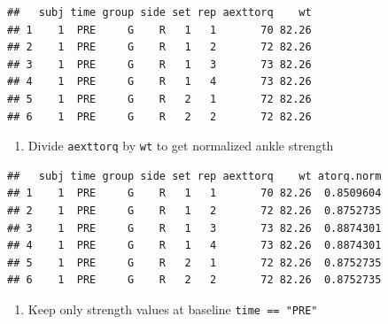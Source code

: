 \documentclass[
]{book}
\newenvironment{Shaded}{\begin{snugshade}}{\end{snugshade}}
\newcommand{\DataTypeTok}[1]{\textcolor[rgb]{0.13,0.29,0.53}{#1}}
\newcommand{\KeywordTok}[1]{\textcolor[rgb]{0.13,0.29,0.53}{\textbf{#1}}}
\newcommand{\NormalTok}[1]{#1}
\newcommand{\OperatorTok}[1]{\textcolor[rgb]{0.81,0.36,0.00}{\textbf{#1}}}
\newcommand{\StringTok}[1]{\textcolor[rgb]{0.31,0.60,0.02}{#1}}
\providecommand{\tightlist}{%
  \setlength{\itemsep}{0pt}\setlength{\parskip}{0pt}}
\begin{document}
\begin{verbatim}
##   subj time group side set rep aexttorq    wt
## 1    1  PRE     G    R   1   1       70 82.26
## 2    1  PRE     G    R   1   2       72 82.26
## 3    1  PRE     G    R   1   3       73 82.26
## 4    1  PRE     G    R   1   4       73 82.26
## 5    1  PRE     G    R   2   1       72 82.26
## 6    1  PRE     G    R   2   2       72 82.26
\end{verbatim}

\begin{enumerate}
\def\labelenumi{\arabic{enumi}.}
\setcounter{enumi}{3}
\tightlist
\item
  Divide \texttt{aexttorq} by \texttt{wt} to get normalized ankle strength
\end{enumerate}

\begin{Shaded}
\end{Shaded}

\begin{verbatim}
##   subj time group side set rep aexttorq    wt atorq.norm
## 1    1  PRE     G    R   1   1       70 82.26  0.8509604
## 2    1  PRE     G    R   1   2       72 82.26  0.8752735
## 3    1  PRE     G    R   1   3       73 82.26  0.8874301
## 4    1  PRE     G    R   1   4       73 82.26  0.8874301
## 5    1  PRE     G    R   2   1       72 82.26  0.8752735
## 6    1  PRE     G    R   2   2       72 82.26  0.8752735
\end{verbatim}

\begin{enumerate}
\def\labelenumi{\arabic{enumi}.}
\setcounter{enumi}{4}
\tightlist
\item
  Keep only strength values at baseline \texttt{time\ ==\ "PRE"}
\end{enumerate}

\begin{Shaded}
\end{Shaded}
\end{document}
